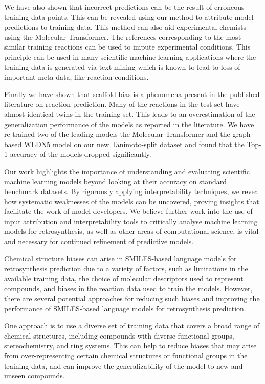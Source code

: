 We have also shown that incorrect predictions can be the result of erroneous training data points. This can be revealed using our method to attribute model predictions to training data. This method can also aid experimental chemists using the Molecular Transformer. The references corresponding to the most similar training reactions can be used to impute experimental conditions. This principle can be used in many scientific machine learning applications where the training data is generated via text-mining which is known to lead to loss of important meta data, like reaction conditions. 

Finally we have shown that scaffold bias is a phenomena present in the published literature on reaction prediction. Many of the reactions in the test set have almost identical twins in the training set. This leads to an overestimation of the generalization performance of the models as reported in the literature. We have re-trained two of the leading models the Molecular Transformer and the graph-based WLDN5 model on our new Tanimoto-split dataset and found that the Top-1 accuracy of the models dropped significantly.

Our work highlights the importance of understanding and evaluating scientific machine learning models beyond looking at their accuracy on standard benchmark datasets. By rigorously applying interpretability techniques, we reveal how systematic weaknesses of the models can be uncovered, proving insights that facilitate the work of model developers. We believe further work into the use of input attribution and interpretability tools to critically analyse machine learning models for retrosynthesis, as well as other areas of computational science, is vital and necessary for continued refinement of predictive models.

Chemical structure biases can arise in SMILES-based language models for retrosynthesis prediction due to a variety of factors, such as limitations in the available training data, the choice of molecular descriptors used to represent compounds, and biases in the reaction data used to train the models. However, there are several potential approaches for reducing such biases and improving the performance of SMILES-based language models for retrosynthesis prediction.

One approach is to use a diverse set of training data that covers a broad range of chemical structures, including compounds with diverse functional groups, stereochemistry, and ring systems. This can help to reduce biases that may arise from over-representing certain chemical structures or functional groups in the training data, and can improve the generalizability of the model to new and unseen compounds.

